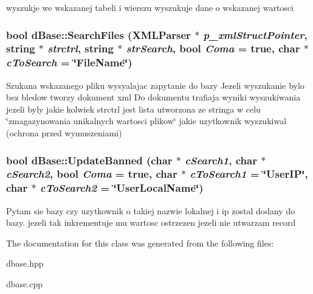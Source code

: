 wyszukje we wskazanej tabeli i wierszu wyszukuje dane o wskazanej wartosci 

\hypertarget{classdBase_a568417f1966cdad5e64f553a96ef201b}{
\subsubsection[{SearchFiles}]{\setlength{\rightskip}{0pt plus 5cm}bool dBase::SearchFiles (XMLParser $\ast$ {\em p\_\-xmlStructPointer}, \/  string $\ast$ {\em strctrl}, \/  string $\ast$ {\em strSearch}, \/  bool {\em Coma} = {\ttfamily true}, \/  char $\ast$ {\em cToSearch} = {\ttfamily \char`\"{}FileName\char`\"{}})}}
\label{classdBase_a568417f1966cdad5e64f553a96ef201b}


Szukana wskazanego pliku wysyalajac zapytanie do bazy Jezeli wyszukanie bylo bez bledow tworzy dokument xml Do dokumentu trafiaja wyniki wyszukiwania jezeli byly jakie kolwiek strctrl jest lista utworzona ze stringa w celu \char`\"{}zmagazynowania unikalnych wartosci plikow\char`\"{} jakie uzytkownik wyszukiwal (ochrona przed wymuszeniami)

\hypertarget{classdBase_ae4b52702ff5312ee8a21b13552c67f7f}{
\subsubsection[{UpdateBanned}]{\setlength{\rightskip}{0pt plus 5cm}bool dBase::UpdateBanned (char $\ast$ {\em cSearch1}, \/  char $\ast$ {\em cSearch2}, \/  bool {\em Coma} = {\ttfamily true}, \/  char $\ast$ {\em cToSearch1} = {\ttfamily \char`\"{}UserIP\char`\"{}}, \/  char $\ast$ {\em cToSearch2} = {\ttfamily \char`\"{}UserLocalName\char`\"{}})}}
\label{classdBase_ae4b52702ff5312ee8a21b13552c67f7f}


Pytam sie bazy czy uzytkownik o takiej nazwie lokalnej i ip zostal dodany do bazy. jezeli tak inkrementuje mu wartosc ostrzezen jezeli nie utwarzam record



The documentation for this class was generated from the following files:\begin{DoxyCompactItemize}
\item 
dbase.hpp\item 
dbase.cpp\end{DoxyCompactItemize}

